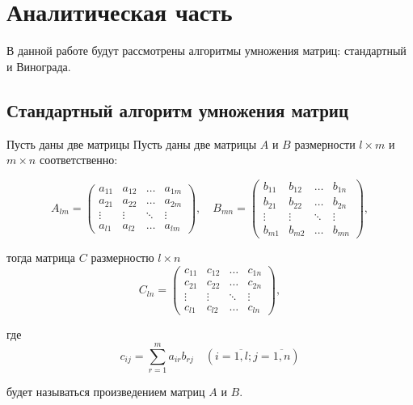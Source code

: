 \chapter{Аналитическая часть}

В данной работе будут рассмотрены алгоритмы умножения матриц: стандартный и Винограда.

\section{Стандартный алгоритм умножения матриц}

Пусть даны две матрицы
Пусть даны две матрицы $A$ и $B$ размерности $l \times m$ и $m \times n$ соответственно:

\begin{equation}
	A_{lm} = \begin{pmatrix}
		a_{11} & a_{12} & \ldots & a_{1m}\\
		a_{21} & a_{22} & \ldots & a_{2m}\\
		\vdots & \vdots & \ddots & \vdots\\
		a_{l1} & a_{l2} & \ldots & a_{lm}
	\end{pmatrix},
	\quad
	B_{mn} = \begin{pmatrix}
		b_{11} & b_{12} & \ldots & b_{1n}\\
		b_{21} & b_{22} & \ldots & b_{2n}\\
		\vdots & \vdots & \ddots & \vdots\\
		b_{m1} & b_{m2} & \ldots & b_{mn}
	\end{pmatrix},
\end{equation}

тогда матрица $C$ размерностю $l \times n$
\begin{equation}
	C_{ln} = \begin{pmatrix}
		c_{11} & c_{12} & \ldots & c_{1n}\\
		c_{21} & c_{22} & \ldots & c_{2n}\\
		\vdots & \vdots & \ddots & \vdots\\
		c_{l1} & c_{l2} & \ldots & c_{ln}
	\end{pmatrix},
\end{equation}

где
\begin{equation}
	\label{eq:M}
	c_{ij} =
	\sum_{r=1}^{m} a_{ir}b_{rj} \quad (i=\overline{1,l}; j=\overline{1,n})
\end{equation}

будет называться произведением матриц $A$ и $B$.

